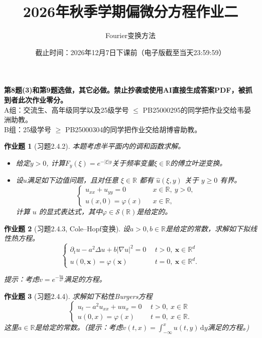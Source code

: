 \documentclass[UTF8,fontset=windows,12pt]{ctexart}
\theoremstyle{kaiti-theorem}
\newtheorem{problem}{作业题}
\numberwithin{equation}{section}
\newcommand{\R}{\mathbb{R}}
\newcommand{\bds}[1]{\boldsymbol{#1}}  %
\newcommand{\p}{\partial}
\newcommand{\lap}{\Delta}
\newcommand{\nab}{\nabla}
\newcommand{\dy}{\,\mathrm{d}y}
\newcommand{\xx}{{\bds{x}}}
\begin{document}
\title{\LARGE{\bf  2026年秋季学期偏微分方程作业二}}
\author{Fourier变换方法}
\date{截止时间：2026年12月7日下课前（电子版截至当天23:59:59）}

\maketitle

\textbf{第8题(3)和第9题选做，其它必做。禁止抄袭或使用AI直接生成答案PDF，被抓到者此次作业零分。}\\
A组：交流生、高年级同学以及25级学号 $\leqslant$ PB25000295的同学把作业交给韦晏洲助教。\\
B组：25级学号 $\geqslant$ PB25000304的同学把作业交给胡博睿助教。

\begin{problem}[习题2.4.2]
本题考虑半平面内的调和函数求解。
\begin{itemize}
\item [(1)] 给定$y>0$, 计算$F_y(\xi)=e^{-|\xi|y}$关于频率变量$\xi\in\R$的傅立叶逆变换。
\item [(2)] 设$u$满足如下边值问题，且对任意 $\xi\in\R$ 都有 $\widehat{u}(\xi,y)$ 关于 $y\geqslant 0$ 有界。
\[
\begin{cases}
u_{xx}+u_{yy}=0&~~~x\in\R,~y>0,\\
u(x,0)=\varphi(x)&~~~x\in\R,
\end{cases}
\]计算 $u$ 的显式表达式，其中$\varphi\in\mathcal{S}(\R)$是给定的。
\end{itemize}
\end{problem}

\begin{problem}[习题2.4.3, Cole--Hopf变换]
设$a>0,b\in\R$是给定的常数，求解如下拟线性热方程。
\[
\begin{cases}
\p_t u-a^2\lap u+b|\nab u|^2=0&~~t>0,~\xx\in\R^d\\
u(0,\xx)=\varphi(\xx)&~~t=0,~\xx\in\R^d.
\end{cases}
\] 

提示：考虑$v=e^{-\frac{bu}{a^2}}$满足的方程。
\end{problem}



\begin{problem}[习题2.4.4]
求解如下粘性Burgers方程
\[
\begin{cases}
u_t-a^2u_{xx}+uu_x=0&~~t>0,~x\in\R\\
u(0,x)=\varphi(x)&~~t=0,~x\in\R.
\end{cases}
\]这里$a\in\R$是给定的常数。（提示：考虑$v(t,x)=\int_{-\infty}^x u(t,y)\dy$满足的方程。)
\end{problem}
\end{document}
